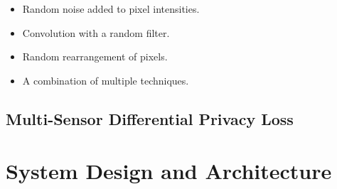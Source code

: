 \documentclass[12pt]{article}
\begin{document}
      \begin{itemize}
        \item Random noise added to pixel intensities.
        \item Convolution with a random filter.
        \item Random rearrangement of pixels.
        \item A combination of multiple techniques.
      \end{itemize}

  \subsection{Multi-Sensor Differential Privacy Loss}

\section{System Design and Architecture}
\end{document}
